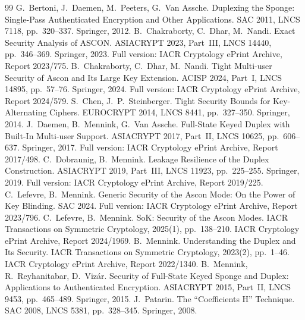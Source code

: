 \documentclass[11pt,a4paper]{article}
\theoremstyle{definition}
\theoremstyle{remark}
\begin{document}
\begin{thebibliography}{99}
 G.~Bertoni, J.~Daemen, M.~Peeters, G.~Van Assche. Duplexing the Sponge: Single-Pass Authenticated
Encryption and Other Applications. SAC 2011, LNCS 7118, pp.~320--337. Springer, 2012.
 B.~Chakraborty, C.~Dhar, M.~Nandi. Exact Security Analysis of ASCON. ASIACRYPT 2023, Part~III,
LNCS 14440, pp.~346--369. Springer, 2023. Full version: IACR Cryptology ePrint Archive, Report 2023/775.
 B.~Chakraborty, C.~Dhar, M.~Nandi. Tight Multi-user Security of Ascon and Its Large Key Extension.
ACISP 2024, Part~I, LNCS 14895, pp.~57--76. Springer, 2024. Full version: IACR Cryptology ePrint Archive, Report 2024/579.
 S.~Chen, J.~P.~Steinberger. Tight Security Bounds for Key-Alternating Ciphers. EUROCRYPT 2014,
LNCS 8441, pp.~327--350. Springer, 2014.
 J.~Daemen, B.~Mennink, G.~Van Assche. Full-State Keyed Duplex with Built-In Multi-user Support.
ASIACRYPT 2017, Part~II, LNCS 10625, pp.~606--637. Springer, 2017. Full version: IACR Cryptology ePrint Archive, Report 2017/498.
 C.~Dobraunig, B.~Mennink. Leakage Resilience of the Duplex Construction. ASIACRYPT 2019, Part~III,
LNCS 11923, pp.~225--255. Springer, 2019. Full version: IACR Cryptology ePrint Archive, Report 2019/225.
 C.~Lefevre, B.~Mennink. Generic Security of the Ascon Mode: On the Power of Key Blinding. SAC 2024.
Full version: IACR Cryptology ePrint Archive, Report 2023/796.
 C.~Lefevre, B.~Mennink. SoK: Security of the Ascon Modes. IACR Transactions on Symmetric Cryptology,
2025(1), pp.~138--210. IACR Cryptology ePrint Archive, Report 2024/1969.
 B.~Mennink. Understanding the Duplex and Its Security. IACR Transactions on Symmetric Cryptology,
2023(2), pp.~1--46. IACR Cryptology ePrint Archive, Report 2022/1340.
 B.~Mennink, R.~Reyhanitabar, D.~Viz\'ar. Security of Full-State Keyed Sponge and Duplex: Applications to
Authenticated Encryption. ASIACRYPT 2015, Part~II, LNCS 9453, pp.~465--489. Springer, 2015.
 J.~Patarin. The ``Coefficients H'' Technique. SAC 2008, LNCS 5381, pp.~328--345. Springer, 2008.
\end{thebibliography}
\end{document}
